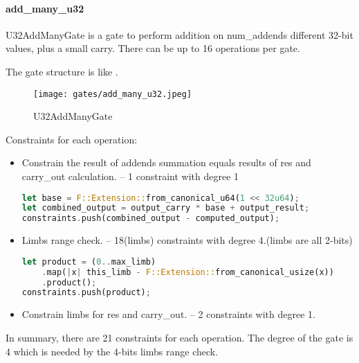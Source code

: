 \paragraph{add\_many\_u32}

\hspace*{\fill}

\indent U32AddManyGate is a gate to perform addition on num\_addends different 32-bit values, plus a small carry. 
There can be up to 16 operations per gate.

The gate structure is like .

\begin{figure}[!ht]
    \centering
    \texttt{[image: gates/add\_many\_u32.jpeg]}
    \caption{U32AddManyGate}
    \label{fig:add-many-u32}
\end{figure}

Constraints for each operation:
\begin{itemize}
    \item Constrain the result of addends summation equals results of res and carry\_out calculation. -- 1 constraint with degree 1
    \begin{lstlisting}[language=rust]
let base = F::Extension::from_canonical_u64(1 << 32u64);
let combined_output = output_carry * base + output_result;
constraints.push(combined_output - computed_output);
    \end{lstlisting}
    \item Limbs range check. -- 18(limbs) constraints with degree 4.(limbs are all 2-bits)
    \begin{lstlisting}[language=rust]
let product = (0..max_limb)
    .map(|x| this_limb - F::Extension::from_canonical_usize(x))
    .product();
constraints.push(product);
    \end{lstlisting}
    \item Constrain limbs for res and carry\_out. -- 2 constraints with degree 1.
\end{itemize}

In summary, there are 21 constraints for each operation. The degree of the gate is 4 which is needed by the 4-bits limbs range check.
